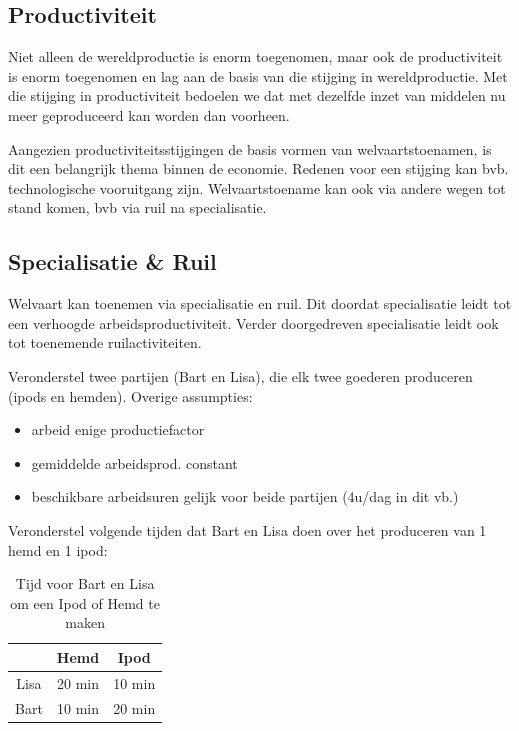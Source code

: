 \subsection{Productiviteit}
Niet alleen de wereldproductie is enorm toegenomen, maar ook de productiviteit is enorm toegenomen en lag aan de basis van die stijging in wereldproductie. Met die stijging in productiviteit bedoelen we dat met dezelfde inzet van middelen nu meer geproduceerd kan worden dan voorheen.

Aangezien productiviteitsstijgingen de basis vormen van welvaartstoenamen, is dit een belangrijk thema binnen de economie. Redenen voor een stijging kan bvb. technologische vooruitgang zijn. Welvaartstoename kan ook via andere wegen tot stand komen, bvb via ruil na specialisatie.

\subsection{Specialisatie \& Ruil}
\label{ssec:SpecialisatieEnRuil}

Welvaart kan toenemen via specialisatie en ruil. Dit doordat specialisatie leidt tot een verhoogde arbeidsproductiviteit. Verder doorgedreven specialisatie leidt ook tot toenemende ruilactiviteiten.

Veronderstel twee partijen (Bart en Lisa), die elk twee goederen produceren (ipods en hemden). Overige assumpties:
\begin{itemize}
	\item arbeid enige productiefactor
    \item gemiddelde arbeidsprod. constant
    \item beschikbare arbeidsuren gelijk voor beide partijen (4u/dag in dit vb.)
\end{itemize}

Veronderstel volgende tijden dat Bart en Lisa doen over het produceren van 1 hemd en 1 ipod:

\begin{table}[h]
	\centering
    \begin{tabular}{ | c |  c |  c | }
		\hline
		& Hemd  &  Ipod \\
		\hline
		 Lisa & 20 min & 10 min \\
		\hline
		Bart & 10 min & 20 min\\
		\hline
	\end{tabular}
	\caption{Tijd voor Bart en Lisa om een Ipod of Hemd te maken}

\end{table}

